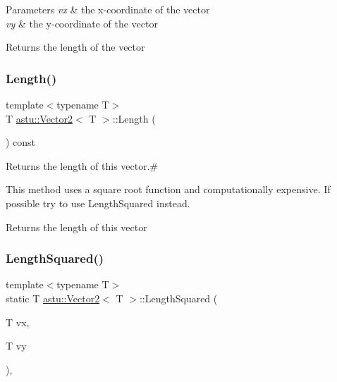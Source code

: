\begin{DoxyParams}{Parameters}
{\em vx} & the x-\/coordinate of the vector \\
\hline
{\em vy} & the y-\/coordinate of the vector \\
\hline
\end{DoxyParams}
\begin{DoxyReturn}{Returns}
the length of the vector 
\end{DoxyReturn}
\mbox{\label{classastu_1_1Vector2_ab195006315ba4e54f6e89e01727dbd08}} 
\subsubsection{\texorpdfstring{Length()}{Length()}\hspace{0.1cm}{\footnotesize\ttfamily [2/2]}}
{\footnotesize\ttfamily template$<$typename T$>$ \\
T \hyperlink{classastu_1_1Vector2}{astu\+::\+Vector2}$<$ T $>$\+::Length (\begin{DoxyParamCaption}{ }\end{DoxyParamCaption}) const\hspace{0.3cm}{\ttfamily [inline]}}

Returns the length of this vector.\#

This method uses a square root function and computationally expensive. If possible try to use {\ttfamily Length\+Squared} instead.

\begin{DoxyReturn}{Returns}
the length of this vector 
\end{DoxyReturn}
\mbox{\label{classastu_1_1Vector2_afbc3ba40ff99e66abbe5db6b5adb6b97}} 
\subsubsection{\texorpdfstring{Length\+Squared()}{LengthSquared()}\hspace{0.1cm}{\footnotesize\ttfamily [1/2]}}
{\footnotesize\ttfamily template$<$typename T$>$ \\
static T \hyperlink{classastu_1_1Vector2}{astu\+::\+Vector2}$<$ T $>$\+::Length\+Squared (\begin{DoxyParamCaption}\item[{T}]{vx,  }\item[{T}]{vy }\end{DoxyParamCaption})\hspace{0.3cm}{\ttfamily [inline]}, {\ttfamily [static]}}

